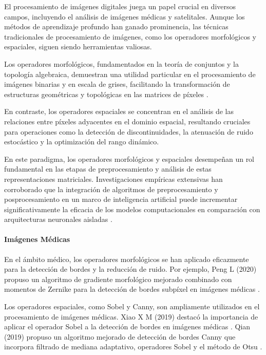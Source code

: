 
El procesamiento de imágenes digitales juega un papel crucial en diversos campos, incluyendo el análisis de imágenes médicas y satelitales. Aunque los métodos de aprendizaje profundo han ganado prominencia, las técnicas tradicionales de procesamiento de imágenes, como los operadores morfológicos y espaciales, siguen siendo herramientas valiosas.

Los operadores morfológicos, fundamentados en la teoría de conjuntos y la topología algebraica, demuestran una utilidad particular en el procesamiento de imágenes binarias y en escala de grises, facilitando la transformación de estructuras geométricas y topológicas en las matrices de píxeles \autocite{gonzalezDigitalImageProcessing2018}. 

En contraste, los operadores espaciales se concentran en el análisis de las relaciones entre píxeles adyacentes en el dominio espacial, resultando cruciales para operaciones como la detección de discontinuidades, la atenuación de ruido estocástico y la optimización del rango dinámico. \autocite{gonzalezDigitalImageProcessing2018}

En este paradigma, los operadores morfológicos y espaciales desempeñan un rol fundamental en las etapas de preprocesamiento y análisis de estas representaciones matriciales. Investigaciones empíricas extensivas han corroborado que la integración de algoritmos de preprocesamiento y posprocesamiento en un marco de inteligencia artificial puede incrementar significativamente la eficacia de los modelos computacionales en comparación con arquitecturas neuronales aisladas \autocite{salviImpactPrePostimage2021}.

\paragraph{Imágenes Médicas} En el ámbito médico, los operadores morfológicos se han aplicado eficazmente para la detección de bordes y la reducción de ruido. Por ejemplo, Peng L (2020) propuso un algoritmo de gradiente morfológico mejorado combinado con momentos de Zernike para la detección de bordes subpíxel en imágenes médicas \autocite{liu2020improvement}.

Los operadores espaciales, como Sobel y Canny, son ampliamente utilizados en el procesamiento de imágenes médicas. Xiao X M (2019) destacó la importancia de aplicar el operador Sobel a la detección de bordes en imágenes médicas \autocite{xiao2019application}. Qian (2019) propuso un algoritmo mejorado de detección de bordes Canny que incorpora filtrado de mediana adaptativo, operadores Sobel y el método de Otsu \autocite{qian2019medical}.\\



